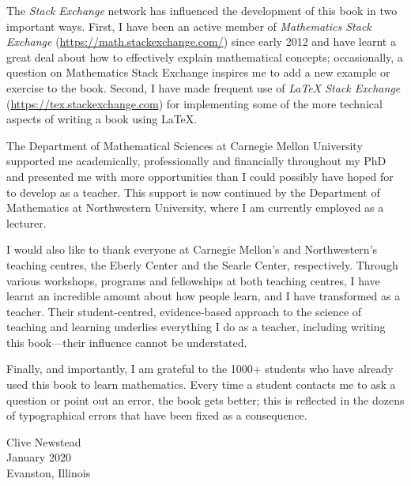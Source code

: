 The \textit{Stack Exchange} network has influenced the development of this book in two important ways. First, I have been an active member of \textit{Mathematics Stack Exchange} (\url{https://math.stackexchange.com/}) since early 2012 and have learnt a great deal about how to effectively explain mathematical concepts; occasionally, a question on Mathematics Stack Exchange inspires me to add a new example or exercise to the book. Second, I have made frequent use of \textit{\LaTeX{} Stack Exchange} (\url{https://tex.stackexchange.com}) for implementing some of the more technical aspects of writing a book using \LaTeX{}.

The Department of Mathematical Sciences at Carnegie Mellon University supported me academically, professionally and financially throughout my PhD and presented me with more opportunities than I could possibly have hoped for to develop as a teacher. This support is now continued by the Department of Mathematics at Northwestern University, where I am currently employed as a lecturer.

I would also like to thank everyone at Carnegie Mellon's and Northwestern's teaching centres, the Eberly Center and the Searle Center, respectively. Through various workshops, programs and fellowships at both teaching centres, I have learnt an incredible amount about how people learn, and I have transformed as a teacher. Their student-centred, evidence-based approach to the science of teaching and learning underlies everything I do as a teacher, including writing this book---their influence cannot be understated.

Finally, and importantly, I am grateful to the 1000+ students who have already used this book to learn mathematics. Every time a student contacts me to ask a question or point out an error, the book gets better; this is reflected in the dozens of typographical errors that have been fixed as a consequence.

\begin{flushright}
Clive Newstead\\
January 2020\\
Evanston, Illinois
\end{flushright}
